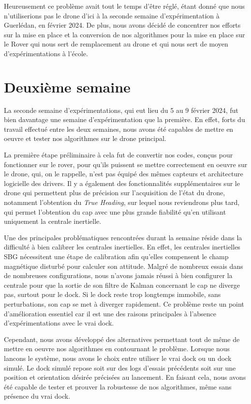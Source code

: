 \documentclass[12pt]{report}
\begin{document}
Heureusement ce problème avait tout le temps d'être réglé, étant donné que nous n'utiliserions pas le drone d'ici à la seconde semaine d'expérimentation à Guerlédan, en février 2024. De plus, nous avons 
décidé de concentrer nos efforts sur la mise en place et la conversion de nos algorithmes pour la mise en place sur le Rover qui nous sert de remplacement au drone et qui nous sert de moyen d'expérimentations à l'école. 


\section{Deuxième semaine}

La seconde semaine d'expérimentations, qui eut lieu du 5 au 9 février 2024, fut bien davantage une semaine d'expérimentation que la première. 
En effet, forts du travail effectué entre les deux semaines, nous avons été capables de mettre en oeuvre et tester nos algorithmes sur le drone principal.

La première étape préliminaire à cela fut de convertir nos codes, conçus pour fonctionner sur le rover, pour qu'ils puissent se mettre correctement en oeuvre sur le drone, qui, on le rappelle, n'est pas
équipé des mêmes capteurs et architecture logicielle des drivers. Il y a également des fonctionnalités supplémentaires sur le drone qui permettent plus de précision sur l'acquisition de l'état du drone, notamment 
l'obtention du \textit{True Heading}, sur lequel nous reviendrons plus tard, qui permet l'obtention du cap avec une plus grande fiabilité qu'en utilisant uniquement la centrale inertielle. 

Une des principales problématiques rencontrées durant la semaine réside dans la difficulté à bien calibrer les centrales inertielles. En effet, les centrales inertielles SBG nécessitent une étape de calibration
afin qu'elles compensent le champ magnétique disturbé pour calculer son attitude. Malgré de nombreux essais dans de nombreuses configurations, nous n'avons jamais réussi à bien configurer la centrale 
pour que la sortie de son filtre de Kalman concernant le cap ne diverge pas, surtout pour le dock. Si le dock reste trop longtemps immobile, sans perturbations, son cap se met à diverger rapidement.
Ce problème reste un point d'amélioration essentiel car il est une des raisons principales à l'absence d'expérimentations avec le vrai dock. 

Cependant, nous avons développé des alternatives permettant tout de même de mettre en oeuvre nos algorithmes en contournant le problème. Lorsque nous lancons le système, nous avons le choix entre
utiliser le vrai dock ou un dock simulé. Le dock simulé repose soit sur des logs d'essais précédents soit sur une position et orientation désirée précisées au lancement. 
En faisant cela, nous avons été capable de tester et prouver la robustesse de nos algorithmes, même sans présence du vrai dock.
\end{document}
